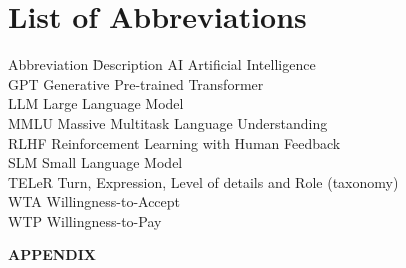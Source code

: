 \documentclass[12pt, a4paper, titlepage]{article}
\begin{document}
\newpage
\tableofcontents

\newpage
\section*{List of Abbreviations}
\begin{tabbing}
    Abbreviation \hspace{1cm} \= Description \kill
    AI \> Artificial Intelligence \\
    GPT \> Generative Pre-trained Transformer \\
    LLM \> Large Language Model \\
    MMLU \> Massive Multitask Language Understanding \\
    RLHF \> Reinforcement Learning with Human Feedback \\
    SLM \> Small Language Model \\
    TELeR \> Turn, Expression, Level of details and Role (taxonomy) \\
    WTA \> Willingness-to-Accept \\
    WTP \> Willingness-to-Pay \\
\end{tabbing}

\newpage
\listoftables
{}

\newpage
\listoffigures
{}


\clearpage
{} %








\clearpage
{} %
\setcounter{page}{7}
\printbibliography

\newpage
\thispagestyle{empty}
\begin{center}
  \vspace*{\fill}
  {\Huge\textbf{APPENDIX}}
  \vspace*{\fill}
\end{center}
\newpage
\setcounter{page}{11}

\end{document}
